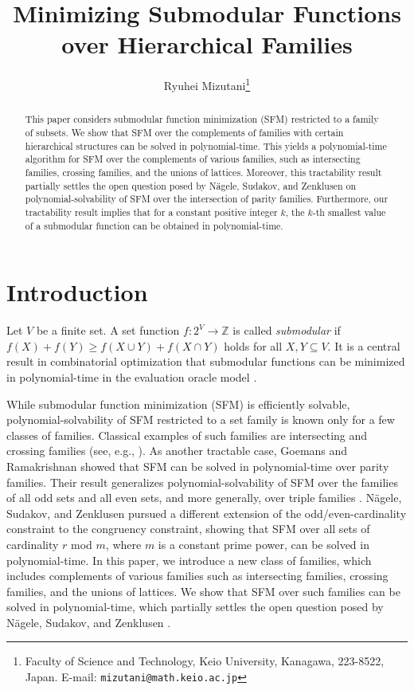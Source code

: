 \documentclass[11pt,letterpaper]{article}
\title{Minimizing Submodular Functions over Hierarchical Families}
\author{Ryuhei Mizutani\thanks{Faculty of Science and Technology, Keio University, Kanagawa, 223-8522, Japan. E-mail: \texttt{mizutani@math.keio.ac.jp}}}
\theoremstyle{plain}
\theoremstyle{definition}
\begin{document}
\maketitle

\begin{abstract}
This paper considers submodular function minimization (SFM) restricted to a family of subsets.
We show that SFM over the complements of families with certain hierarchical structures can be solved in polynomial-time.
This yields a polynomial-time algorithm for SFM over the complements of various families, such as intersecting families, crossing families, and the unions of lattices.
Moreover, this tractability result partially settles the open question posed by N\"{a}gele, Sudakov, and Zenklusen on polynomial-solvability of SFM over the intersection of parity families.
Furthermore, our tractability result implies that for a constant positive integer $k$, the $k$-th smallest
value of a submodular function can be obtained in polynomial-time.
\end{abstract}

\section{Introduction}
\label{sec:intro}
Let $V$ be a finite set.
A set function $f:2^V\to \mathbb{Z}$ is called \textit{submodular} if $f(X)+f(Y)\ge f(X\cup Y)+f(X\cap Y)$ holds for all $X,Y\subseteq V$.
It is a central result in combinatorial optimization that submodular functions can be minimized in polynomial-time in the evaluation oracle model \cite{grotschel1981,iwata2001,schrijver2000}.

While submodular function minimization (SFM) is efficiently solvable, polynomial-solvability of SFM restricted to a set family is known only for a few classes of families.
Classical examples of such families are intersecting and crossing families (see, e.g., \cite[Volume B]{schrijver2003}).
As another tractable case, Goemans and Ramakrishnan \cite{goemans1995} showed that SFM can be solved in polynomial-time over parity families.
Their result generalizes polynomial-solvability of SFM over the families of all odd sets and all even sets, and more generally, over triple families \cite{grotschel1981}. 
N\"{a}gele, Sudakov, and Zenklusen \cite{nagele2019} pursued a different extension of the odd/even-cardinality constraint to the congruency constraint, showing that SFM over all sets of cardinality $r$ mod $m$, where $m$ is a constant prime power, can be solved in polynomial-time.
In this paper, we introduce a new class of families, which includes complements of various families such as intersecting families, crossing families, and the unions of lattices.
We show that SFM over such  families can be solved in polynomial-time, which partially settles the open question posed by N\"{a}gele, Sudakov, and Zenklusen \cite{nagele2019}.
\end{document}
